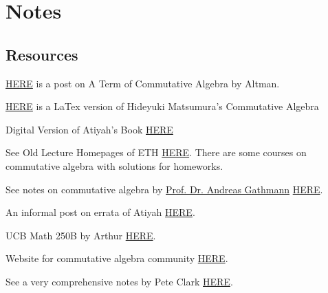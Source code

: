 \section{Notes}

\subsection{Resources}


\href{https://mathoverflow.net/questions/385312/latest-a-term-of-commutative-algebra-by-altman-and-kleiman}{HERE} is a post on A Term of Commutative Algebra by Altman.

\href{https://aareyanmanzoor.github.io/assets/matsumura-CA.pdf}{HERE} is a LaTex version of Hideyuki Matsumura's Commutative Algebra

Digital Version of Atiyah's Book \href{https://digitalcommons.unl.edu/cgi/viewcontent.cgi?article=1004&context=mathclass}{HERE}

See Old Lecture Homepages of ETH \href{https://www2.math.ethz.ch/education/bachelor/lectures.html}{HERE}. There are some courses on commutative algebra with solutions for homeworks.

See notes on commutative algebra by \href{https://math.rptu.de/en/wgs/agag/people/head/gathmann/}{Prof. Dr. Andreas Gathmann} \href{https://agag-gathmann.math.rptu.de/en/commalg.php}{HERE}.

An informal post on errata of Atiyah \href{https://mathoverflow.net/questions/42241/errata-for-atiyah-macdonald}{HERE}.

UCB Math 250B by Arthur \href{https://math.berkeley.edu/~ogus/Math_250B-2016/index.html}{HERE}.

Website for commutative algebra community \href{https://commalg.org}{HERE}.

See a very comprehensive notes by Pete Clark \href{http://alpha.math.uga.edu/%7Epete/integral.pdf}{HERE}.